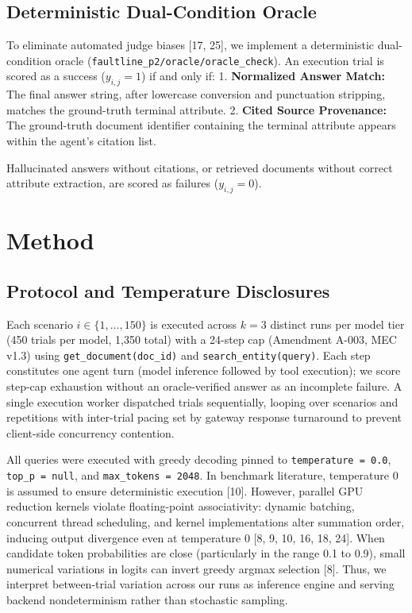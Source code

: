 \documentclass[11pt,letterpaper]{article}
\begin{document}
\subsection{Deterministic Dual-Condition Oracle}
To eliminate automated judge biases [17, 25], we implement a deterministic dual-condition oracle (\texttt{faultline\_p2/oracle/oracle\_check}). An execution trial is scored as a success ($y_{i,j} = 1$) if and only if:
1. \textbf{Normalized Answer Match:} The final answer string, after lowercase conversion and punctuation stripping, matches the ground-truth terminal attribute.
2. \textbf{Cited Source Provenance:} The ground-truth document identifier containing the terminal attribute appears within the agent's citation list.

Hallucinated answers without citations, or retrieved documents without correct attribute extraction, are scored as failures ($y_{i,j} = 0$).



\section{Method}

\subsection{Protocol and Temperature Disclosures}
Each scenario $i \in \{1, \dots, 150\}$ is executed across $k=3$ distinct runs per model tier (450 trials per model, 1,350 total) with a 24-step cap (Amendment A-003, MEC v1.3) using \texttt{get\_document(doc\_id)} and \texttt{search\_entity(query)}. Each step constitutes one agent turn (model inference followed by tool execution); we score step-cap exhaustion without an oracle-verified answer as an incomplete failure. A single execution worker dispatched trials sequentially, looping over scenarios and repetitions with inter-trial pacing set by gateway response turnaround to prevent client-side concurrency contention.

All queries were executed with greedy decoding pinned to \texttt{temperature = 0.0}, \texttt{top\_p = null}, and \texttt{max\_tokens = 2048}. In benchmark literature, temperature 0 is assumed to ensure deterministic execution [10]. However, parallel GPU reduction kernels violate floating-point associativity: dynamic batching, concurrent thread scheduling, and kernel implementations alter summation order, inducing output divergence even at temperature 0 [8, 9, 10, 16, 18, 24]. When candidate token probabilities are close (particularly in the range 0.1 to 0.9), small numerical variations in logits can invert greedy argmax selection [8]. Thus, we interpret between-trial variation across our runs as inference engine and serving backend nondeterminism rather than stochastic sampling.
\end{document}
